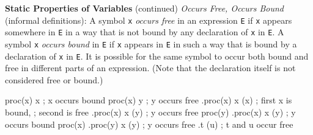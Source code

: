 \begin{minipage}[t]{\sw}
\slidenumber
\LARGE
{\bf Static Properties of Variables} (continued)\exx
{\em Occurs Free, Occurs Bound} (informal definitions):\exx
A symbol \verb'x' {\em occurs free} in an expression \verb'E'
if \verb'x' appears somewhere in \verb'E'
in a way that is not bound by any declaration of \verb'x' in \verb'E'.
A symbol \verb'x' {\em occurs bound} in \verb'E'
if \verb'x' appears in \verb'E' in such a way
that is bound by a declaration of \verb'x' in \verb'E'.
It is possible for the same symbol to occur both bound and free
in different parts of an expression.
(Note that the declaration itself is not considered
free or bound.)
\begin{qv}
proc(x) {x}                ; x occurs bound
proc(x) {y}                ; y occurs free
.proc(x) {x} (x)           ; first x is bound,
                           ; second is free
.proc(x) {x} (y)           ; y occurs free
proc(y) {.proc(x) {x} (y)} ; y occurs bound
proc(x) {.proc(y) {x} (y)} ; y occurs free
.t (u)                     ; t and u occur free
\end{qv}

\end{minipage}
\clearpage
